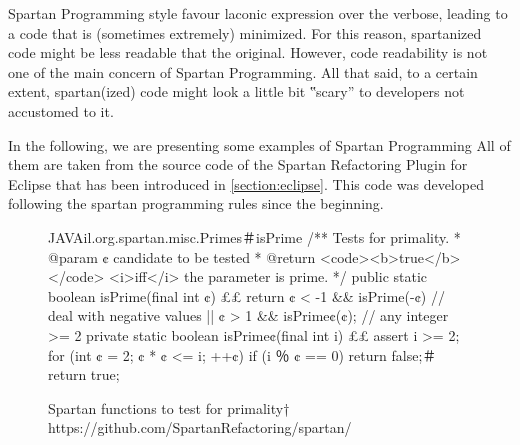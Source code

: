 Spartan Programming style favour laconic expression over the verbose, leading
to a code that is (sometimes extremely) minimized. For this reason, spartanized
code might be less readable that the original. However, code readability is not
one of the main concern of Spartan Programming. All that said, to a certain
extent, spartan(ized) code might look a little bit ‟scary” to developers not
accustomed to it.

In the following, we are presenting some examples of Spartan
Programming %
All of them are taken from the source code of the Spartan Refactoring Plugin
for Eclipse that has been introduced in \cref{section:eclipse}. This code was
developed following the spartan programming rules since the beginning.



%
%
\begin{figure}[h]
\label{figure:shock-2}
\caption{Spartan functions to test for primality†{
      https://github.com/SpartanRefactoring/spartan/
      }
     }
\begin{Code}{JAVA}{il.org.spartan.misc.Primes＃isPrime}
/** Tests for primality.
  * @param ¢ candidate to be tested
  * @return <code><b>true</b></code> <i>iff</i> the parameter is prime. */
public static boolean isPrime(final int ¢) {££
  return ¢ < -1 && isPrime(-¢) // deal with negative values
      || ¢ > 1 && isPrime¢(¢); // any integer >= 2
}
private static boolean isPrime¢(final int i) {££
  assert i >= 2;
  for (int ¢ = 2; ¢ * ¢ <= i; ++¢)
    if (i ％ ¢ == 0)
      return false;＃
  return true;
}
\end{Code}
\end{figure}

